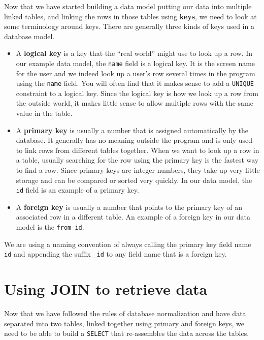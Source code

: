 Now that we have started building a data model putting our
data into multiple linked tables, and linking the rows in those
tables using {\bf keys}, we need to look at some terminology 
around keys.  There are generally three kinds of keys used 
in a database model.

\begin{itemize}

\item A {\bf logical key} is a key that the ``real world'' might use
to look up a row.   In our example data model, the {\tt name}
field is a logical key.  It is the screen name for the user 
and we indeed look up a user's row several times in the program
using the {\tt name} field.  You will often find that it makes
sense to add a {\tt UNIQUE} constraint to a logical key.  Since the 
logical key is how we look up a row from the outside world, it makes
little sense to allow multiple rows with the same value in the table.

\item A {\bf primary key} is usually a number that is assigned
automatically by the database.  It generally has no meaning outside
the program and is only used to link rows from different tables
together.  When we want to look up a row in a table, usually 
searching for the row using the primary key is the fastest 
way to find a row.  Since primary keys are integer numbers, they 
take up very little storage and can be compared or sorted very quickly.
In our data model, the {\tt id} field is an example of a primary key.

\item A {\bf foreign key} is usually a number that points to the primary key
of an associated row in a different table.  An example of a foreign
key in our data model is the \verb"from_id".  

\end{itemize}

We are using a
naming convention of always calling the primary key field name
{\tt id} and appending the suffix \verb"_id" to any field name
that is a foreign key.


\section{Using JOIN to retrieve data}

Now that we have followed the rules of database normalization
and have data separated into two tables, linked together using
primary and foreign keys, we need to be able to build a 
{\tt SELECT} that re-assembles the data across the tables.

